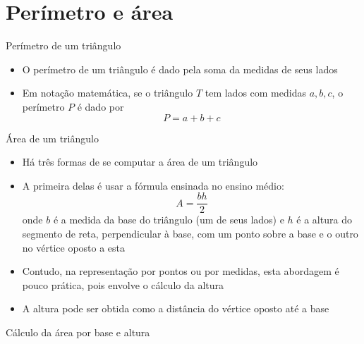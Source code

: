 \section{Perímetro e área}

\begin{frame}[fragile]{Perímetro de um triângulo}

    \begin{itemize}
        \item O perímetro de um triângulo é dado pela soma da medidas de seus lados
        \pause

        \item Em notação matemática, se o triângulo $T$ tem lados com medidas $a, b, c$, o
            perímetro $P$ é dado por
        \[
            P = a + b + c
        \]
    \end{itemize}
        \pause


\end{frame}

\begin{frame}[fragile]{Área de um triângulo}

    \begin{itemize}
        \item Há três formas de se computar a área de um triângulo
        \pause

        \item A primeira delas é usar a fórmula ensinada no ensino médio:
            \[
                A = \frac{bh}{2}
            \]
        onde $b$ é a medida da base do triângulo (um de seus lados) e $h$ é a altura
        do segmento de reta, perpendicular à base, com um ponto sobre a base e o outro no vértice 
        oposto a esta
        \pause

        \item Contudo, na representação por pontos ou por medidas, esta abordagem é pouco 
            prática, pois envolve o cálculo da altura
        \pause

        \item A altura pode ser obtida como a distância do vértice oposto até a base
    \end{itemize}

\end{frame}

\begin{frame}[fragile]{Cálculo da área por base e altura}
\end{frame}

